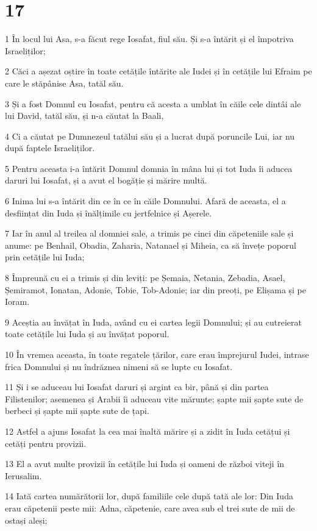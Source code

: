 \chapter{17}

\par 1 În locul lui Asa, s-a făcut rege Iosafat, fiul său. Și s-a întărit și el împotriva Israeliților;
\par 2 Căci a așezat oștire în toate cetățile întărite ale Iudei și în cetățile lui Efraim pe care le stăpânise Asa, tatăl său.
\par 3 Și a fost Domnul cu Iosafat, pentru că acesta a umblat în căile cele dintâi ale lui David, tatăl său, și n-a căutat la Baali,
\par 4 Ci a căutat pe Dumnezeul tatălui său și a lucrat după poruncile Lui, iar nu după faptele Israeliților.
\par 5 Pentru aceasta i-a întărit Domnul domnia în mâna lui și tot Iuda îi aducea daruri lui Iosafat, și a avut el bogăție și mărire multă.
\par 6 Inima lui s-a întărit din ce în ce în căile Domnului. Afară de aceasta, el a desființat din Iuda și înălțimile cu jertfelnice și Așerele.
\par 7 Iar în anul al treilea al domniei sale, a trimis pe cinci din căpeteniile sale și anume: pe Benhail, Obadia, Zaharia, Natanael și Miheia, ca să învețe poporul prin cetățile lui Iuda;
\par 8 Împreună cu ei a trimis și din leviți: pe Șemaia, Netania, Zebadia, Asael, Șemiramot, Ionatan, Adonie, Tobie, Tob-Adonie; iar din preoți, pe Elișama și pe Ioram.
\par 9 Aceștia au învățat în Iuda, având cu ei cartea legii Domnului; și au cutreierat toate cetățile lui Iuda și au învățat poporul.
\par 10 În vremea aceasta, în toate regatele țărilor, care erau împrejurul Iudei, intrase frica Domnului și nu îndrăznea nimeni să se lupte cu Iosafat.
\par 11 Și i se aduceau lui Iosafat daruri și argint ca bir, până și din partea Filistenilor; asemenea și Arabii îi aduceau vite mărunte; șapte mii șapte sute de berbeci și șapte mii șapte sute de țapi.
\par 12 Astfel a ajuns Iosafat la cea mai înaltă mărire și a zidit în Iuda cetățui și cetăți pentru provizii.
\par 13 El a avut multe provizii în cetățile lui Iuda și oameni de război viteji în Ierusalim.
\par 14 Iată cartea numărătorii lor, după familiile cele după tată ale lor: Din Iuda erau căpetenii peste mii: Adna, căpetenie, care avea sub el trei sute de mii de ostași aleși;
